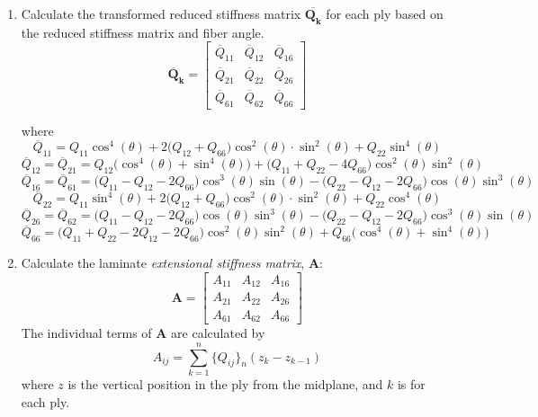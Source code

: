 \documentclass{article}
\begin{document}
\begin{enumerate}
    \item Calculate the transformed reduced stiffness matrix $\bm{\overline{Q_{k}}}$ for each ply based on the reduced stiffness matrix and fiber angle.
    \begin{equation}
        \bm{\overline{Q}_{k}} =
        \left[ \begin{array}{ccc}
            \overline{Q}_{11} & \overline{Q}_{12} & \overline{Q}_{16} \\
            \overline{Q}_{21} & \overline{Q}_{22} & \overline{Q}_{26} \\
            \overline{Q}_{61} & \overline{Q}_{62} & \overline{Q}_{66}
        \end{array} \right]
    \end{equation}

    where \\
    $$
        \overline{Q}_{11} = Q_{11}\cos^{4}(\theta) + 2\big(Q_{12} + Q_{66}\big)\cos^{2}(\theta)\cdot\sin^{2}(\theta) + Q_{22}\sin^{4}(\theta)
    $$
    $$
        \overline{Q}_{12} = \overline{Q}_{21} = Q_{12}\big(\cos^{4}(\theta) + \sin^{4}(\theta)\big) + \big(Q_{11} + Q_{22} - 4Q_{66}\big)\cos^{2}(\theta)\sin^{2}(\theta)
    $$
    $$
        \overline{Q}_{16} = \overline{Q}_{61} = \big(Q_{11} - Q_{12} - 2Q_{66}\big)\cos^{3}(\theta)\sin(\theta) - \big(Q_{22} - Q_{12} - 2Q_{66}\big)\cos(\theta)\sin^{3}(\theta)
    $$
    $$
        \overline{Q}_{22} = Q_{11}\sin^{4}(\theta) + 2\big(Q_{12} + Q_{66}\big)\cos^{2}(\theta)\cdot\sin^{2}(\theta) + Q_{22}\cos^{4}(\theta)
    $$
    $$
        \overline{Q}_{26} = \overline{Q}_{62} = \big(Q_{11} - Q_{12} - 2Q_{66}\big)\cos(\theta)\sin^{3}(\theta) - \big(Q_{22} - Q_{12} - 2Q_{66}\big)\cos^{3}(\theta)\sin(\theta)
    $$
    $$
        \overline{Q}_{66} = \big(Q_{11} + Q_{22} - 2Q_{12} - 2Q_{66}\big)\cos^{2}(\theta)\sin^{2}(\theta) + Q_{66}\big(\cos^{4}(\theta) + \sin^{4}(\theta)\big)
    $$

    \item Calculate the laminate \emph{extensional stiffness matrix}, $\bm{A}$:
    \begin{equation}
    \bm{A} = \left[\begin{array}{ccc} A_{11} & A_{12} & A_{16} \\ A_{21} & A_{22} & A_{26} \\ A_{61} & A_{62} & A_{66}\end{array}\right]
    \end{equation}
    The individual terms of $\bm{A}$ are calculated by
    \begin{equation}
        A_{ij} = \sum_{k=1}^{n} \big\{Q_{ij}\big\}_{n} \left(z_{k} - z_{k-1}\right)
    \end{equation}
    where $z$ is the vertical position in the ply from the midplane, and $k$ is for each ply.


\end{enumerate}
\end{document}
